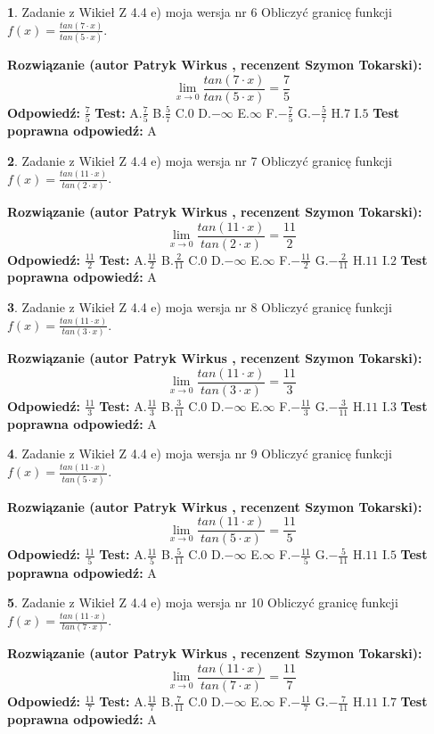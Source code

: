 \documentclass[12pt, a4paper]{article}
\theoremstyle{definition} %
\newtheorem{zad}{}
\newcommand{\zadStart}[1]{\begin{zad}#1\newline}
\newcommand{\zadStop}{\end{zad}}
\newcommand{\rozwStart}[2]{\noindent \textbf{Rozwiązanie (autor #1 , recenzent #2): }\newline}
\newcommand{\rozwStop}{\newline}
\newcommand{\odpStart}{\noindent \textbf{Odpowiedź:}\newline}
\newcommand{\odpStop}{\newline}
\newcommand{\testStart}{\noindent \textbf{Test:}\newline}
\newcommand{\testStop}{\newline}
\newcommand{\kluczStart}{\noindent \textbf{Test poprawna odpowiedź:}\newline}
\newcommand{\kluczStop}{\newline}
\begin{document}
\zadStart{Zadanie z Wikieł Z 4.4 e) moja wersja nr 6}
Obliczyć granicę funkcji $f(x)=\frac{tan(7\cdot x)}{tan(5\cdot x)}$.
\zadStop
\rozwStart{Patryk Wirkus}{Szymon Tokarski}
$$\lim\limits_{x\to 0}\frac{tan(7\cdot x)}{tan(5\cdot x)}=
\frac{7}{5}$$
\rozwStop
\odpStart
$\frac{7}{5}$
\odpStop
\testStart
A.$\frac{7}{5}$
B.$\frac{5}{7}$
C.$0$
D.$-\infty$
E.$\infty$
F.$-\frac{7}{5}$
G.$-\frac{5}{7}$
H.$7$
I.$5$
\testStop
\kluczStart
A
\kluczStop



\zadStart{Zadanie z Wikieł Z 4.4 e) moja wersja nr 7}
Obliczyć granicę funkcji $f(x)=\frac{tan(11\cdot x)}{tan(2\cdot x)}$.
\zadStop
\rozwStart{Patryk Wirkus}{Szymon Tokarski}
$$\lim\limits_{x\to 0}\frac{tan(11\cdot x)}{tan(2\cdot x)}=
\frac{11}{2}$$
\rozwStop
\odpStart
$\frac{11}{2}$
\odpStop
\testStart
A.$\frac{11}{2}$
B.$\frac{2}{11}$
C.$0$
D.$-\infty$
E.$\infty$
F.$-\frac{11}{2}$
G.$-\frac{2}{11}$
H.$11$
I.$2$
\testStop
\kluczStart
A
\kluczStop



\zadStart{Zadanie z Wikieł Z 4.4 e) moja wersja nr 8}
Obliczyć granicę funkcji $f(x)=\frac{tan(11\cdot x)}{tan(3\cdot x)}$.
\zadStop
\rozwStart{Patryk Wirkus}{Szymon Tokarski}
$$\lim\limits_{x\to 0}\frac{tan(11\cdot x)}{tan(3\cdot x)}=
\frac{11}{3}$$
\rozwStop
\odpStart
$\frac{11}{3}$
\odpStop
\testStart
A.$\frac{11}{3}$
B.$\frac{3}{11}$
C.$0$
D.$-\infty$
E.$\infty$
F.$-\frac{11}{3}$
G.$-\frac{3}{11}$
H.$11$
I.$3$
\testStop
\kluczStart
A
\kluczStop



\zadStart{Zadanie z Wikieł Z 4.4 e) moja wersja nr 9}
Obliczyć granicę funkcji $f(x)=\frac{tan(11\cdot x)}{tan(5\cdot x)}$.
\zadStop
\rozwStart{Patryk Wirkus}{Szymon Tokarski}
$$\lim\limits_{x\to 0}\frac{tan(11\cdot x)}{tan(5\cdot x)}=
\frac{11}{5}$$
\rozwStop
\odpStart
$\frac{11}{5}$
\odpStop
\testStart
A.$\frac{11}{5}$
B.$\frac{5}{11}$
C.$0$
D.$-\infty$
E.$\infty$
F.$-\frac{11}{5}$
G.$-\frac{5}{11}$
H.$11$
I.$5$
\testStop
\kluczStart
A
\kluczStop



\zadStart{Zadanie z Wikieł Z 4.4 e) moja wersja nr 10}
Obliczyć granicę funkcji $f(x)=\frac{tan(11\cdot x)}{tan(7\cdot x)}$.
\zadStop
\rozwStart{Patryk Wirkus}{Szymon Tokarski}
$$\lim\limits_{x\to 0}\frac{tan(11\cdot x)}{tan(7\cdot x)}=
\frac{11}{7}$$
\rozwStop
\odpStart
$\frac{11}{7}$
\odpStop
\testStart
A.$\frac{11}{7}$
B.$\frac{7}{11}$
C.$0$
D.$-\infty$
E.$\infty$
F.$-\frac{11}{7}$
G.$-\frac{7}{11}$
H.$11$
I.$7$
\testStop
\kluczStart
A
\kluczStop
\end{document}
